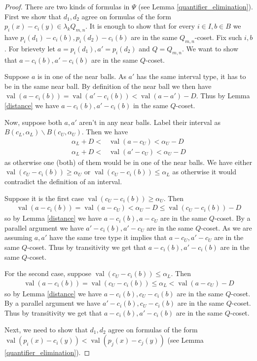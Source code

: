 \documentclass{amsart}
\DeclareMathOperator{\val}{val}
\DeclareMathOperator{\vval}{val}
\begin{document}
\begin{proof}
  There are two kinds of formulas in $\Psi$
  (see Lemma \ref{quantifier_elimination}).
  First we show that $d_1, d_2$ agree on formulas of the form $p_i(x) - c_i(y) \in \lambda_k Q_{m,n}$.
  It is enough to show that for every $i \in I, b \in B$ we have $p_i(d_1) - c_i(b), p_i(d_2) - c_i(b)$ are in the same $Q_{m,n}$-coset.
  Fix such $i, b$.
  For brievety let $a = p_i(d_1), a' = p_i(d_2)$ and $Q = Q_{m,n}$.
  We want to show that $a - c_i(b), a' - c_i(b)$ are in the same $Q$-coset.
  
  Suppose $a$ is in one of the near balls.
  As $a'$ has the same interval type, it has to be in the same near ball.
  By definition of the near ball we then have $\val(a - c_i(b)) = \val(a' - c_i(b)) < \val(a - a') - D$.
  Thus by Lemma \ref{distance} we have $a - c_i(b), a' - c_i(b)$ in the same $Q$-coset.
  
  Now, suppose both $a, a'$ aren't in any near balls.
  Label their interval as $B(c_L, \alpha_L) \backslash B(c_U, \alpha_U)$.
  Then we have 
  \begin{align*}
    \alpha_L + D < &\val (a - c_U) < \alpha_U - D \\
    \alpha_L + D < &\val (a' - c_U) < \alpha_U - D
  \end{align*}
  as otherwise one (both) of them would be in one of the near balls.
  We have either $\val(c_U - c_i(b)) \geq \alpha_U$ or $\val(c_U - c_i(b)) \leq \alpha_L$
  as otherwise it would contradict the definition of an interval.
  
  Suppose it is the first case $\val(c_U - c_i(b)) \geq \alpha_U$.
  Then
  \begin{align*}
    \val(a - c_i(b)) = \val(a - c_U) < \alpha_U - D \leq \val(c_U - c_i(b)) - D
  \end{align*}
  so by Lemma \ref{distance} we have $a - c_i(b), a - c_U$ are in the same $Q$-coset.
  By a parallel argument we have $a' - c_i(b), a' - c_U$ are in the same $Q$-coset.
  As we are assuming $a, a'$ have the same tree type it implies that $a - c_U, a' - c_U$ are in the same $Q$-coset.
  Thus by transitivity we get that $a - c_i(b), a' - c_i(b)$ are in the same $Q$-coset.
  
  For the second case, suppose $\val(c_U - c_i(b)) \leq \alpha_L$.
  Then
  \begin{align*}
    \val(a - c_i(b)) = \val(c_U - c_i(b)) \leq \alpha_L < \val(a - c_U) - D
  \end{align*}
  so by Lemma \ref{distance} we have $a - c_i(b), c_U - c_i(b)$ are in the same $Q$-coset.
  By a parallel argument we have $a' - c_i(b), c_U - c_i(b)$ are in the same $Q$-coset.
  Thus by transitivity we get that $a - c_i(b), a' - c_i(b)$ are in the same $Q$-coset.

  Next, we need to show that $d_1, d_2$ agree on formulas of the form
  $\vval (p_i(x) - c_i(y)) < \vval (p_j(x) - c_j(y))$ 
  (see Lemma \ref{quantifier_elimination}).
\end{proof}
\end{document}
